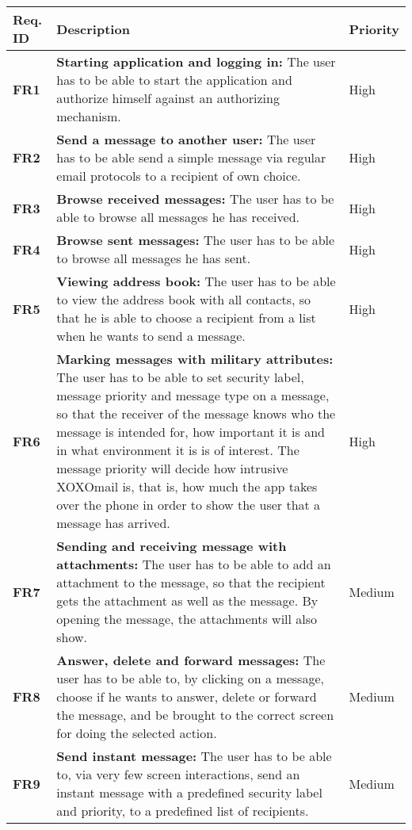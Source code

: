 
\begin{longtable}{>{\setlength\hsize{.3\hsize}}X|>{\setlength\hsize{0.7\hsize}}X|>{\setlength\hsize{.3\hsize}}X}\hline
\textbf{Req. ID} & \textbf{Description} & \textbf{Priority} \\ \hline \hline

\textbf{FR1} & \textbf{Starting application and logging in:} The user has to be able to start the application and authorize himself against an authorizing mechanism. & High \\ \hline
\textbf{FR2} & \textbf{Send a message to another user:} The user has to be able send a simple message via regular email protocols to a recipient of own choice. & High \\ \hline
\textbf{FR3} & \textbf{Browse received messages:} The user has to be able to browse all messages he has received. & High \\ \hline
\textbf{FR4} & \textbf{Browse sent messages:} The user has to be able to browse all messages he has sent.& High \\ \hline
\textbf{FR5} & \textbf{Viewing address book:} The user has to be able to view the address book with all contacts, so that he is able to choose a recipient from a list when he wants to send a message. & High \\ \hline
\textbf{FR6} & \textbf{Marking messages with military attributes:} The user has to be able to set security label, message priority and message type on a message, so that the receiver of the message knows who the message is intended for, how important it is and in what environment it is is of interest. The message priority will decide how intrusive XOXOmail is, that is, how much the app takes over the phone in order to show the user that a message has arrived.  & High \\ \hline
\textbf{FR7} & \textbf{Sending and receiving message with attachments:} The user has to be able to add an attachment to the message, so that the recipient gets the attachment as well as the message. By opening the message, the attachments will also show. & Medium \\ \hline
\textbf{FR8} & \textbf{Answer, delete and forward messages:} The user has to be able to, by clicking on a message, choose if he wants to answer, delete or forward the message, and be brought to the correct screen for doing the selected action. & Medium \\ \hline
\textbf{FR9} & \textbf{Send instant message:} The user has to be able to, via very few screen interactions, send an instant message with a predefined security label and priority, to a predefined list of recipients. & Medium \\ \hline

\end{longtable}
